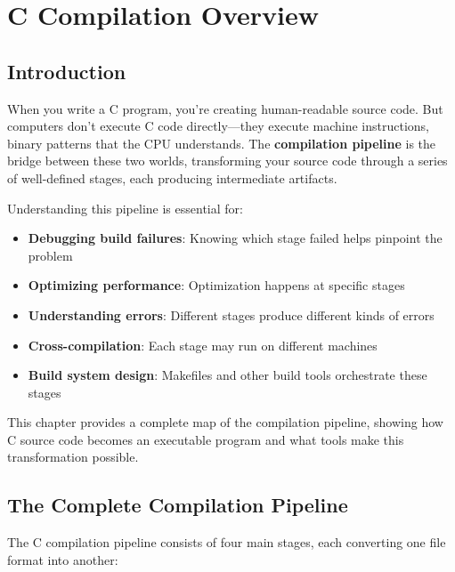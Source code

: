 \chapter{C Compilation Overview}

\section{Introduction}

When you write a C program, you're creating human-readable source code. But computers don't execute C code directly—they execute machine instructions, binary patterns that the CPU understands. The \textbf{compilation pipeline} is the bridge between these two worlds, transforming your source code through a series of well-defined stages, each producing intermediate artifacts.

Understanding this pipeline is essential for:
\begin{itemize}
    \item \textbf{Debugging build failures}: Knowing which stage failed helps pinpoint the problem
    \item \textbf{Optimizing performance}: Optimization happens at specific stages
    \item \textbf{Understanding errors}: Different stages produce different kinds of errors
    \item \textbf{Cross-compilation}: Each stage may run on different machines
    \item \textbf{Build system design}: Makefiles and other build tools orchestrate these stages
\end{itemize}

This chapter provides a complete map of the compilation pipeline, showing how C source code becomes an executable program and what tools make this transformation possible.

\section{The Complete Compilation Pipeline}

The C compilation pipeline consists of four main stages, each converting one file format into another:

